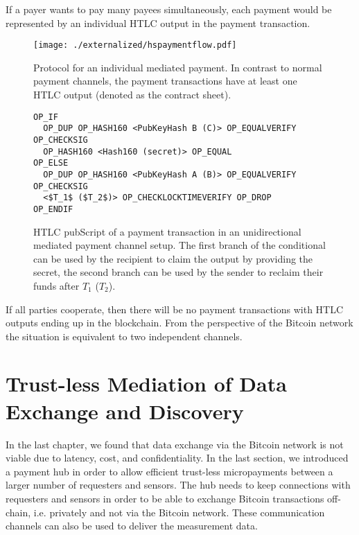 If a payer wants to pay many payees simultaneously, each payment would be represented by an individual \ac{HTLC} output in the payment transaction.

\begin{figure}
\centering
\texttt{[image: ./externalized/hspaymentflow.pdf]}
\caption{Protocol for an individual mediated payment. In contrast to normal payment channels, the payment transactions have at least one \ac{HTLC} output (denoted as the contract sheet).}
\label{fig:unimedpc}
\end{figure}

\begin{figure}
\begin{lstlisting}[breaklines,mathescape=true]
OP_IF
  OP_DUP OP_HASH160 <PubKeyHash B (C)> OP_EQUALVERIFY OP_CHECKSIG
  OP_HASH160 <Hash160 (secret)> OP_EQUAL
OP_ELSE
  OP_DUP OP_HASH160 <PubKeyHash A (B)> OP_EQUALVERIFY OP_CHECKSIG
  <$T_1$ ($T_2$)> OP_CHECKLOCKTIMEVERIFY OP_DROP
OP_ENDIF
\end{lstlisting} 
\caption{\ac{HTLC} pubScript of a payment transaction in an unidirectional mediated payment channel setup. The first branch of the conditional can be used by the recipient to claim the output by providing the secret, the second branch can be used by the sender to reclaim their funds after $T_1$ ($T_2$).}
\label{fig:pubScriptHTLC}
\end{figure}

If all parties cooperate, then there will be no payment transactions with \ac{HTLC} outputs ending up in the blockchain. From the perspective of the Bitcoin network the situation is equivalent to two independent channels.

\section{Trust-less Mediation of Data Exchange and Discovery}
\label{sec:trustlessexchange}

In the last chapter, we found that data exchange via the Bitcoin network is not viable due to latency, cost, and confidentiality. In the last section, we introduced a payment hub in order to allow efficient trust-less micropayments between a larger number of requesters and sensors. The hub needs to keep connections with requesters and sensors in order to be able to exchange Bitcoin transactions off-chain, i.e. privately and not via the Bitcoin network. These communication channels can also be used to deliver the measurement data.

